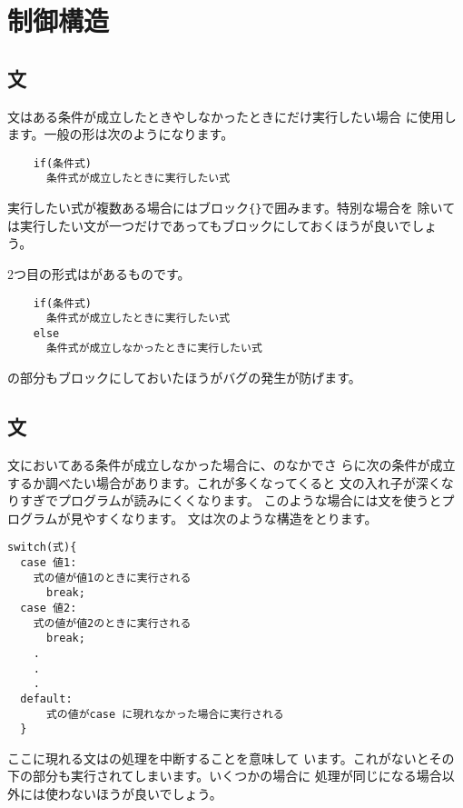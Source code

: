 \section{制御構造}
\subsection{\protect{}文}
文はある条件が成立したときやしなかったときにだけ実行したい場合
に使用します。一般の形は次のようになります。
\begin{verbatim}
	if(条件式)
	  条件式が成立したときに実行したい式
\end{verbatim}
実行したい式が複数ある場合にはブロック\verb+{}+で囲みます。特別な場合を
除いては実行したい文が一つだけであってもブロックにしておくほうが良いでしょ
う。

2つ目の形式はがあるものです。
\begin{verbatim}
	if(条件式)
	  条件式が成立したときに実行したい式
	else
	  条件式が成立しなかったときに実行したい式
\end{verbatim}
の部分もブロックにしておいたほうがバグの発生が防げます。
\subsection{\protect{}文}
文においてある条件が成立しなかった場合に、のなかでさ
らに次の条件が成立するか調べたい場合があります。これが多くなってくると
文の入れ子が深くなりすぎでプログラムが読みにくくなります。
このような場合には文を使うとプログラムが見やすくなります。
文は次のような構造をとります。
\begin{verbatim}
switch(式){
  case 値1:
    式の値が値1のときに実行される
	  break; 
  case 値2:
    式の値が値2のときに実行される
	  break;
    .
    .
    .
  default:
	  式の値がcase に現れなかった場合に実行される
  }   
\end{verbatim}
ここに現れる文はの処理を中断することを意味して
います。これがないとその下の部分も実行されてしまいます。いくつかの場合に
処理が同じになる場合以外には使わないほうが良いでしょう。
